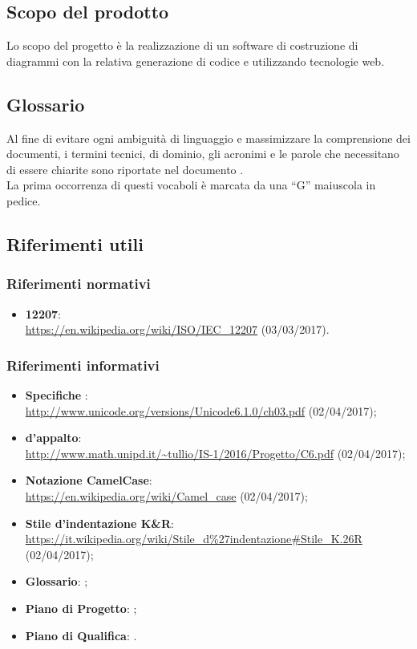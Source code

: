\documentclass[../NormeDiProgetto.tex]{subfiles}
\begin{document}
		\subsection{Scopo del prodotto}
			Lo scopo del progetto è la realizzazione di un software di
			costruzione di diagrammi  con la relativa generazione
			di codice  e  utilizzando tecnologie
			web.
		\subsection{Glossario}
			Al fine di evitare ogni ambiguità di linguaggio e massimizzare la
			comprensione dei documenti, i termini tecnici, di dominio, gli
			acronimi e le parole che necessitano di essere chiarite sono
			riportate nel documento \glossariov.\\
			La prima occorrenza di questi vocaboli è
			marcata da una ``G'' maiuscola in pedice.
		\subsection{Riferimenti utili}
			\subsubsection{Riferimenti normativi}
    			\begin{itemize}
    				\item \textbf{ 12207}:\\
    				\url{https://en.wikipedia.org/wiki/ISO/IEC_12207} (03/03/2017).
				\end{itemize}
			\subsubsection{Riferimenti informativi}	
				\begin{itemize}
					\item \textbf{Specifiche }:\\
					\url{http://www.unicode.org/versions/Unicode6.1.0/ch03.pdf} (02/04/2017);
					\item \textbf{ d'appalto}:\\
					\url{http://www.math.unipd.it/~tullio/IS-1/2016/Progetto/C6.pdf} (02/04/2017);
					\item \textbf{Notazione CamelCase}:\\
					\url{https://en.wikipedia.org/wiki/Camel_case} (02/04/2017);
					\item \textbf{Stile d'indentazione K\&R}:\\
					\url{https://it.wikipedia.org/wiki/Stile_d\%27indentazione#Stile_K.26R} (02/04/2017);
					\item \textbf{Glossario}: \glossariov;
					\item \textbf{Piano di Progetto}: \pianodiprogettov;
					\item \textbf{Piano di Qualifica}: \pianodiqualificav.
				\end{itemize}
\end{document}
